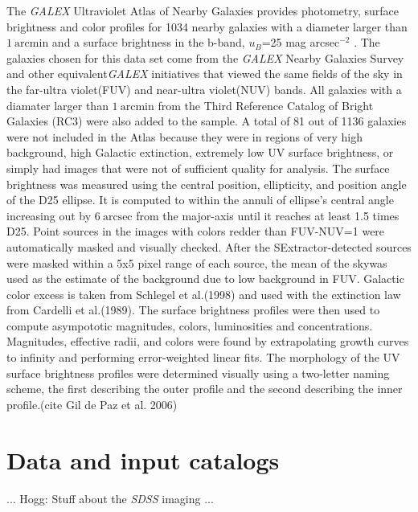 \documentclass[12pt,preprint,dvipdf]{aastex}
\newcommand{\project}[1]{\textsl{#1}}
\newcommand{\units}[1]{\mathrm{#1}}
\renewcommand{\arcmin}{\units{arcmin}}
\renewcommand{\arcsec}{\units{arcsec}}
\begin{document}
    The \textit{GALEX} Ultraviolet Atlas of Nearby Galaxies provides photometry, surface brightness and color profiles for 1034 nearby galaxies with a diameter larger than $1~\arcmin$ and a surface brightness in the b-band, $u_B$=25 mag arcsec$^{-2}$ . The galaxies chosen for this data set come from the \textit{GALEX} Nearby Galaxies Survey and other equivalent\textit{GALEX} initiatives that viewed the same fields of the sky in the far-ultra violet(FUV) and near-ultra violet(NUV) bands. All galaxies with a diamater larger than $1~\arcmin$ from the Third Reference Catalog of Bright Galaxies (RC3) were also added to the sample. A total of 81 out of 1136 galaxies were not included in the Atlas because they were in regions of very high background, high Galactic extinction, extremely low UV surface brightness, or simply had images that were not of sufficient quality for analysis. The surface brightness was measured using the central position, ellipticity, and position angle of the D25 ellipse. It is computed to within the annuli of ellipse's central angle increasing out by $6~\arcsec$ from the major-axis until it reaches at least 1.5 times D25. Point sources in the images with colors redder than FUV-NUV=1 were automatically masked and visually checked. After the SExtractor-detected sources were masked within a 5x5 pixel range of each source, the mean of the skywas used as the estimate of the background due to low background in FUV. Galactic color excess is taken from Schlegel et al.(1998) and used with the extinction law from Cardelli et al.(1989). The surface brightness profiles were then used to compute asympototic magnitudes, colors, luminosities and concentrations. Magnitudes, effective radii, and colors were found by extrapolating growth curves to infinity and performing error-weighted linear fits. The morphology of the UV surface brightness profiles were determined visually using a two-letter naming scheme, the first describing the outer profile and the second describing the inner profile.(cite Gil de Paz et al. 2006)


\section{Data and input catalogs}

... Hogg: Stuff about the \project{SDSS} imaging ...
\end{document}

